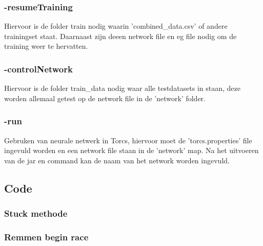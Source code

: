 \documentclass{article}
\begin{document}
\subsubsection*{-resumeTraining}
Hiervoor is de folder train nodig waarin 'combined\_data.csv' of andere trainingset staat. Daarnaast zijn deeen network file en eg file nodig om de training weer te hervatten.
\subsubsection*{-controlNetwork} 
Hiervoor is de folder train\_data nodig waar alle testdatasets in staan, deze worden allemaal getest op de network file in de 'network' folder.
\subsubsection*{-run}
Gebruken van neurale netwerk in Torcs, hiervoor moet de 'torcs.properties' file ingevuld worden en een network file staan in de 'network' map. Na het uitvoeren van de jar en command kan de naam van het network worden ingevuld.
\pagebreak
\subsection{Code}
\subsubsection*{Stuck methode}
\label{stuckmethode}

\pagebreak
\subsubsection*{Remmen begin race}
\label{breaks}

\newpage

\newpage

%

\end{document}
